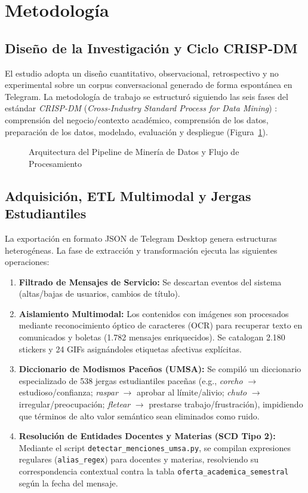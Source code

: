 \section{Metodología}
\label{sec:metodologia}

\subsection{Diseño de la Investigación y Ciclo CRISP-DM}

El estudio adopta un diseño cuantitativo, observacional, retrospectivo y no experimental sobre un corpus conversacional generado de forma espontánea en Telegram. La metodología de trabajo se estructuró siguiendo las seis fases del estándar \emph{CRISP-DM} (\emph{Cross-Industry Standard Process for Data Mining}) \citep{chapman2000crisp}: comprensión del negocio/contexto académico, comprensión de los datos, preparación de los datos, modelado, evaluación y despliegue (Figura~\ref{fig:pipeline_arquitectura}).

\begin{figure}[htbp]
  \centering
  
  \vspace{6pt}
  \caption{Arquitectura del Pipeline de Minería de Datos y Flujo de Procesamiento}
  \label{fig:pipeline_arquitectura}
\end{figure}

\subsection{Adquisición, ETL Multimodal y Jergas Estudiantiles}

La exportación en formato JSON de Telegram Desktop genera estructuras heterogéneas. La fase de extracción y transformación ejecuta las siguientes operaciones:
\begin{enumerate}
  \item \textbf{Filtrado de Mensajes de Servicio:} Se descartan eventos del sistema (altas/bajas de usuarios, cambios de título).
  \item \textbf{Aislamiento Multimodal:} Los contenidos con imágenes son procesados mediante reconocimiento óptico de caracteres (OCR) para recuperar texto en comunicados y boletas (1.782 mensajes enriquecidos). Se catalogan 2.180 stickers y 24 GIFs asignándoles etiquetas afectivas explícitas.
  \item \textbf{Diccionario de Modismos Paceños (UMSA):} Se compiló un diccionario especializado de 538 jergas estudiantiles paceñas (e.g., \emph{corcho} $\to$ estudioso/confianza; \emph{raspar} $\to$ aprobar al límite/alivio; \emph{chuto} $\to$ irregular/preocupación; \emph{fletear} $\to$ prestarse trabajo/frustración), impidiendo que términos de alto valor semántico sean eliminados como ruido.
  \item \textbf{Resolución de Entidades Docentes y Materias (SCD Tipo 2):} Mediante el script \texttt{detectar\_menciones\_umsa.py}, se compilan expresiones regulares (\texttt{alias\_regex}) para docentes y materias, resolviendo su correspondencia contextual contra la tabla \texttt{oferta\_}\allowbreak\texttt{academica\_semestral} según la fecha del mensaje.
\end{enumerate}

